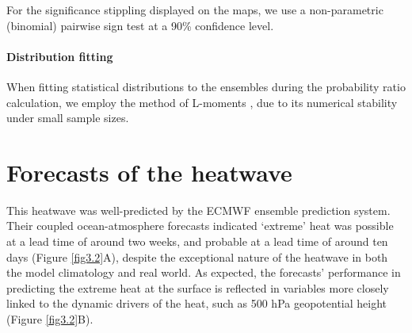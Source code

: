       For the significance stippling displayed on the maps, we use a non-parametric (binomial) pairwise sign test at a 90\% confidence level.

    \paragraph{Distribution fitting}

      When fitting statistical distributions to the ensembles during the probability ratio calculation, we employ the method of L-moments \citep{hosking_l-moments_1990}, due to its numerical stability under small sample sizes.

  \section{Forecasts of the heatwave}\label{ch3:forecasts}

    This heatwave was well-predicted by the ECMWF ensemble prediction system. Their coupled ocean-atmosphere forecasts indicated `extreme' heat was possible at a lead time of around two weeks, and probable at a lead time of around ten days (Figure \ref{fig3.2}A), despite the exceptional nature of the heatwave in both the model climatology and real world. As expected, the forecasts' performance in predicting the extreme heat at the surface is reflected in variables more closely linked to the dynamic drivers of the heat, such as 500 hPa geopotential height (Figure \ref{fig3.2}B). 
    
